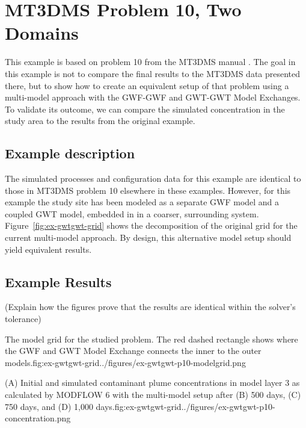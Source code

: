 \section{MT3DMS Problem 10, Two Domains}

This example is based on problem 10 from the MT3DMS manual \citep{zheng1999mt3dms}. The goal in this example is not to compare the final results to the MT3DMS data presented there, but to show how to create an equivalent setup of that problem using a multi-model approach with the GWF-GWF and GWT-GWT Model Exchanges. To validate its outcome, we can compare the simulated concentration in the study area to the \mf results from the original example.

\subsection{Example description}

The simulated processes and configuration data for this example are identical to those in \mf  MT3DMS problem 10 elsewhere in these examples. However, for this example the study site has been modeled as a separate GWF model and a coupled GWT model, embedded in in a coarser, surrounding system. Figure~\ref{fig:ex-gwtgwt-grid} shows the decomposition of the original grid for the current multi-model approach. By design, this alternative model setup should yield equivalent results.

\subsection{Example Results}

(Explain how the figures prove that the results are identical within the solver’s tolerance)

\begin{StandardFigure}{The model grid for the studied problem. The red dashed rectangle shows where the GWF and GWT Model Exchange connects the inner to the outer models.}{fig:ex-gwtgwt-grid}{../figures/ex-gwtgwt-p10-modelgrid.png}
\end{StandardFigure}

\begin{StandardFigure}{(A) Initial and simulated contaminant plume concentrations in model layer 3 as calculated by MODFLOW 6 with the multi-model setup after (B) 500 days, (C) 750 days, and (D) 1,000 days.}{fig:ex-gwtgwt-grid}{../figures/ex-gwtgwt-p10-concentration.png}
\end{StandardFigure}

